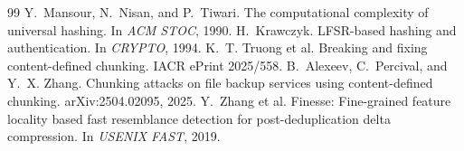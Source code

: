 \documentclass[10pt,twocolumn]{article}
\begin{document}
\begin{thebibliography}{99}
 Y.~Mansour, N.~Nisan, and P.~Tiwari. The computational complexity of universal hashing. In \emph{ACM STOC}, 1990.
 H.~Krawczyk. LFSR-based hashing and authentication. In \emph{CRYPTO}, 1994.
 K.~T. Truong et al. Breaking and fixing content-defined chunking. IACR ePrint 2025/558.
 B.~Alexeev, C.~Percival, and Y.~X. Zhang. Chunking attacks on file backup services using content-defined chunking. arXiv:2504.02095, 2025.
 Y.~Zhang et al. Finesse: Fine-grained feature locality based fast resemblance detection for post-deduplication delta compression. In \emph{USENIX FAST}, 2019.
\end{thebibliography}
\end{document}

